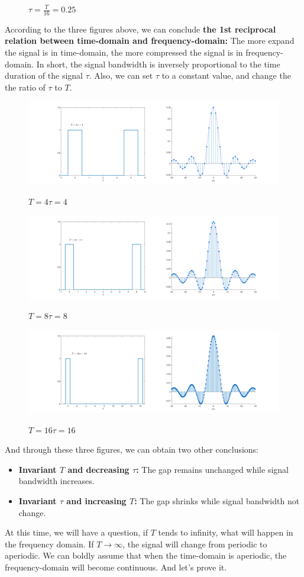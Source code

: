 \documentclass[margin,line]{res}
\begin{document}
\begin{resume}
\begin{figure}[H]
	\centerline{\textbf{$\tau = \frac{T}{16} = 0.25$}}
\end{figure}
According to the three figures above, we can conclude 
\textbf{the 1st reciprocal relation between time-domain and frequency-domain:} 
The more expand the signal is in time-domain, the more compressed the signal is in frequency-domain. In short, the signal bandwidth is inversely proportional to the time duration of the signal $\tau$.
Also, we can set $\tau$ to a constant value, and change the the ratio of $\tau$ to $T$.
\begin{figure}[H]
	\centerline{\includegraphics[width=0.9\linewidth]{figure/bw_4.png}}
	\centerline{\textbf{$T = 4\tau = 4$}}
\end{figure}
\begin{figure}[H]
	\centerline{\includegraphics[width=0.9\linewidth]{figure/bw_5.png}}
	\centerline{\textbf{$T = 8\tau = 8$}}
\end{figure}
\begin{figure}[H]
	\centerline{\includegraphics[width=0.9\linewidth]{figure/bw_6.png}}
	\centerline{\textbf{$T = 16\tau = 16$}}
\end{figure}
And through these three figures, we can obtain two other conclusions:
\begin{itemize}
	\item \textbf{Invariant $T$ and decreasing $\tau$:} The gap remains unchanged while signal bandwidth increases.
	\item \textbf{Invariant $\tau$ and increasing $T$:} The gap shrinks while signal bandwidth not change.
\end{itemize}
At this time, we will have a question, if $T$ tends to infinity, what will happen in the frequency domain. If $T\rightarrow \infty$, the signal will change from periodic to aperiodic. We can boldly assume that when the time-domain is aperiodic, the frequency-domain will become continuous. And let's prove it.
\clearpage


\end{resume}
\end{document}
